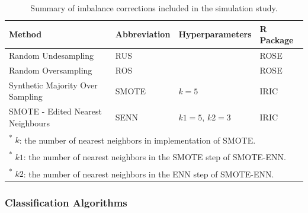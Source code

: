 \documentclass[AMA,STIX1COL,]{WileyNJD-v2}
\begin{document}
\begin{table}[!h]

\caption{\label{tab:corrections} Summary of imbalance corrections included in the simulation study.}
\centering
\begin{tabular}[t]{llll}
\toprule
Method & Abbreviation & Hyperparameters & R Package\\
\midrule
Random Undesampling & RUS &  & ROSE \cite{rose}\\
\addlinespace
Random Oversampling & ROS &  & ROSE \cite{rose}\\
\addlinespace
Synthetic Majority Over Sampling & SMOTE & $k=5$ & IRIC \cite{iric}\\
\addlinespace
SMOTE - Edited Nearest Neighbours & SENN & $k1=5$, $k2 = 3$ & IRIC \cite{iric}\\
\bottomrule
\multicolumn{4}{l}{\rule{0pt}{1em}\textsuperscript{*}      $k$: the number of nearest neighbors in implementation of SMOTE.}\\
\multicolumn{4}{l}{\rule{0pt}{1em}\textsuperscript{*}     $k1$: the number of nearest neighbors in the SMOTE step of SMOTE-ENN.}\\
\multicolumn{4}{l}{\rule{0pt}{1em}\textsuperscript{*}     $k2$: the number of nearest neighbors in the ENN step of SMOTE-ENN.}\\
\end{tabular}
\end{table}

\hypertarget{classification-algorithms}{%
\subsubsection{Classification
Algorithms}\label{classification-algorithms}}
\end{document}
